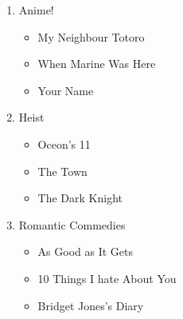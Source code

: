 \begin{enumerate}
\item Anime!
\begin{itemize}
\item My Neighbour Totoro
\item When Marine Was Here
\item Your Name
\end{itemize}
\item Heist
\begin{itemize}
\item Oceon's 11
\item The Town
\item The Dark Knight
\end{itemize}
\item Romantic Commedies
\begin{itemize}
\item As Good as It Gets
\item 10 Things I hate About You
\item Bridget Jones's Diary
\end{itemize}
\end{enumerate}